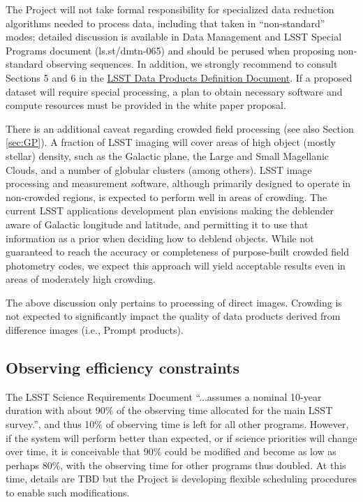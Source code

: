 \documentclass[DM,lsstdraft,toc,usenatbib]{lsstdoc}
\begin{document}
The Project will not take formal responsibility for specialized data reduction algorithms 
needed to process data, including that taken in ``non-standard'' modes; detailed discussion is 
available in Data Management and LSST Special Programs document (ls.st/dmtn-065) and should
be perused when proposing non-standard observing sequences. In addition, we strongly recommend to 
consult Sections 5 and 6 in the \href{http://ls.st/dpdd}{LSST Data Products Definition Document}. If a proposed dataset will 
require special processing, a plan to obtain necessary software and compute resources must be 
provided in the white paper proposal.

There is an additional caveat regarding crowded field processing (see also Section \ref{sec:GP}). 
A fraction of LSST imaging will cover areas of high object (mostly stellar) density, such as the 
Galactic plane, the Large and Small Magellanic Clouds, and a number of globular clusters (among 
others). LSST image processing and measurement software, although primarily designed to operate 
in non-crowded regions, is expected to perform well in areas of crowding. The current LSST applications 
development plan envisions making the deblender aware of Galactic longitude and latitude, and 
permitting it to use that information as a prior when deciding how to deblend objects. While not 
guaranteed to reach the accuracy or completeness of purpose-built crowded field photometry codes, 
we expect this approach will yield acceptable results even in areas of moderately high crowding.

The above discussion only pertains to processing of direct images. Crowding is not expected to 
significantly impact the quality of data products derived from difference images (i.e., Prompt 
products).


\subsection{Observing efficiency constraints} 

The LSST Science Requirements Document  ``...assumes a nominal 10-year duration with about 90\% 
of the observing time allocated for the main LSST survey.'', and thus 10\% of observing time is left for 
all other programs. However, if the system will perform better than expected, or if science priorities 
will change over time, it is conceivable that 90\% could be modified and become as low as perhaps 80\%, 
with the observing time for other programs thus doubled. At this time, details are TBD but the Project
is developing flexible scheduling procedures to enable such modifications. 
\end{document}
